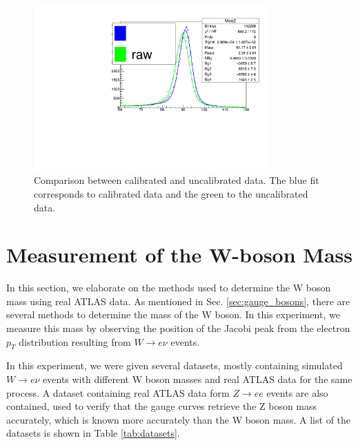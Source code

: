 \documentclass[a4paper]{report}
\numberwithin{equation}{section}
\begin{document}
\begin{figure}[htpb]
    \centering
    \includegraphics[width=0.8\textwidth]{calib_compare}
    \caption{Comparison between calibrated and uncalibrated data. The blue fit corresponds to calibrated data and the green to the uncalibrated data.}
    \label{fig:calib-compare}
\end{figure}

\chapter{Measurement of the W-boson Mass} \label{chap:wboson}

In this section, we elaborate on the methods used to determine the W boson mass using real ATLAS data. As mentioned in Sec. 
\ref{sec:gauge_bosons}, there are several methods to determine the mass of the W boson. In this experiment, we measure this 
mass by observing the position of the Jacobi peak from the electron $p_T$ distribution resulting from $W \rightarrow e\nu$ 
events. \par 

In this experiment, we were given several datasets, mostly containing simulated $W \rightarrow e\nu$ events with 
different W boson masses and real ATLAS data for the same process. A dataset containing real ATLAS data 
form $Z \rightarrow ee$ events are also contained, used to verify that the gauge curves retrieve the Z boson mass accurately, which 
is known more accurately than the W boson mass. A list of the datasets is shown in Table \ref{tab:datasets}. 
\end{document}
